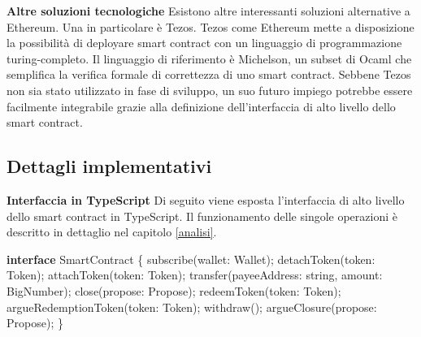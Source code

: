 \documentclass[12pt,italian,]{book}
\newenvironment{Shaded}{}{}
\newcommand{\AttributeTok}[1]{\textcolor[rgb]{0.49,0.56,0.16}{#1}}
\newcommand{\DataTypeTok}[1]{\textcolor[rgb]{0.56,0.13,0.00}{#1}}
\newcommand{\KeywordTok}[1]{\textcolor[rgb]{0.00,0.44,0.13}{\textbf{#1}}}
\newcommand{\NormalTok}[1]{#1}
\newcommand{\OperatorTok}[1]{\textcolor[rgb]{0.40,0.40,0.40}{#1}}
\begin{document}
\textbf{\textbf{Altre soluzioni tecnologiche}} Esistono altre interessanti soluzioni alternative a Ethereum. Una in particolare è Tezos. Tezos come Ethereum mette a disposizione la possibilità di deployare smart contract con un linguaggio di programmazione turing-completo. Il linguaggio di riferimento è Michelson, un subset di Ocaml che semplifica la verifica formale di correttezza di uno smart contract. Sebbene Tezos non sia stato utilizzato in fase di sviluppo, un suo futuro impiego potrebbe essere facilmente integrabile grazie alla definizione dell'interfaccia di alto livello dello smart contract.

\hypertarget{dettagli-implementativi}{%
\subsection{Dettagli implementativi}\label{dettagli-implementativi}}

\textbf{\textbf{Interfaccia in TypeScript}} Di seguito viene esposta l'interfaccia di alto livello dello smart contract in TypeScript. Il funzionamento delle singole operazioni è descritto in dettaglio nel capitolo \ref{analisi}.

\begin{Shaded}
\begin{Highlighting}[]
\KeywordTok{interface}\NormalTok{ SmartContract }\OperatorTok{\{}
    \AttributeTok{subscribe}\NormalTok{(}\DataTypeTok{wallet}\OperatorTok{:}\NormalTok{ Wallet)}\OperatorTok{;}
    \AttributeTok{detachToken}\NormalTok{(}\DataTypeTok{token}\OperatorTok{:}\NormalTok{ Token)}\OperatorTok{;}
    \AttributeTok{attachToken}\NormalTok{(}\DataTypeTok{token}\OperatorTok{:}\NormalTok{ Token)}\OperatorTok{;}
    \AttributeTok{transfer}\NormalTok{(}\DataTypeTok{payeeAddress}\OperatorTok{:}\NormalTok{ string}\OperatorTok{,} \DataTypeTok{amount}\OperatorTok{:}\NormalTok{ BigNumber)}\OperatorTok{;}
    \AttributeTok{close}\NormalTok{(}\DataTypeTok{propose}\OperatorTok{:}\NormalTok{ Propose)}\OperatorTok{;}
    \AttributeTok{redeemToken}\NormalTok{(}\DataTypeTok{token}\OperatorTok{:}\NormalTok{ Token)}\OperatorTok{;}
    \AttributeTok{argueRedemptionToken}\NormalTok{(}\DataTypeTok{token}\OperatorTok{:}\NormalTok{ Token)}\OperatorTok{;}
    \AttributeTok{withdraw}\NormalTok{()}\OperatorTok{;}
    \AttributeTok{argueClosure}\NormalTok{(}\DataTypeTok{propose}\OperatorTok{:}\NormalTok{ Propose)}\OperatorTok{;}
\OperatorTok{\}}
\end{Highlighting}
\end{Shaded}
\end{document}
